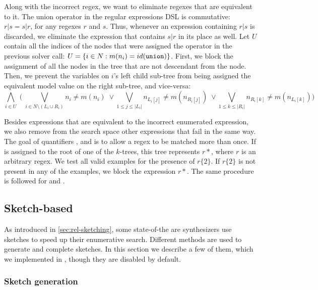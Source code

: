 \noindent
Along with the incorrect regex, we want to eliminate regexes that are equivalent to it. The union operator in the regular expressions DSL is commutative: \(r|s = s|r\), for any regexes \(r\) and \(s\). Thus, whenever an expression containing \(r|s\) is discarded, we eliminate the expression that contains \(s|r\) in its place as well.
%
Let \(U\) contain all the indices of the nodes that were assigned the \Union{} operator in the previous solver call: \(U = \{i \in N: m(n_i) = id(\texttt{union}{})\}\). First, we block the assignment of all the nodes in the tree that are not descendant from the \Union{} node. Then, we prevent the variables on \(i\)'s left child sub-tree from being assigned the equivalent model value on the right sub-tree, and vice-versa:
\begin{equation}
\bigwedge_{i \in U} \;\Biggl(\;
\bigvee_{i \in N \setminus (L_i \cup R_i)} n_i \ne m(n_i) \;\lor
\bigvee_{1 \le j \le |L_i|} n_{L_i[j]} \ne m(n_{R_i[j]}) \;\lor
\bigvee_{1 \le k \le |R_i|} n_{R_i[k]} \ne m(n_{L_i[k]}) \Biggr)
\end{equation}

\noindent
Besides expressions that are equivalent to the incorrect enumerated expression, we also remove from the search space other expressions that fail in the same way. The goal of quantifiers \Kleene{}, \Posit{} and \Range{} is to allow a regex to be matched more than once. If \Kleene{} is assigned to the root of one of the \(k\)-trees, this tree represents \(r*\), where \(r\) is an arbitrary regex. We test all valid examples for the presence of \(r\{2\}\). If \(r\{2\}\) is not present in any of the examples, we block the expression \(r*\). The same procedure is followed for \Posit{} and \Range{}.

\subsection{Sketch-based}\label{sec:regex-sketches}

As introduced in \autoref{sec:rel-sketching}, some state-of-the are synthesizers use sketches to speed up their enumerative search. Different methods are used to generate and complete sketches. In this section we describe a few of them, which we implemented in \Forest{}, though they are disabled by default.

\subsubsection{Sketch generation}

